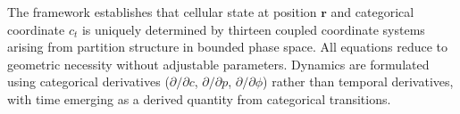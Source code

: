 \documentclass[12pt,a4paper]{article}
\theoremstyle{plain}
\theoremstyle{definition}
\theoremstyle{remark}
\begin{document}
The framework establishes that cellular state at position $\mathbf{r}$ and categorical coordinate $c_t$ is uniquely determined by thirteen coupled coordinate systems arising from partition structure in bounded phase space. All equations reduce to geometric necessity without adjustable parameters. Dynamics are formulated using categorical derivatives ($\partial/\partial c$, $\partial/\partial p$, $\partial/\partial \phi$) rather than temporal derivatives, with time emerging as a derived quantity from categorical transitions.



\end{document}
